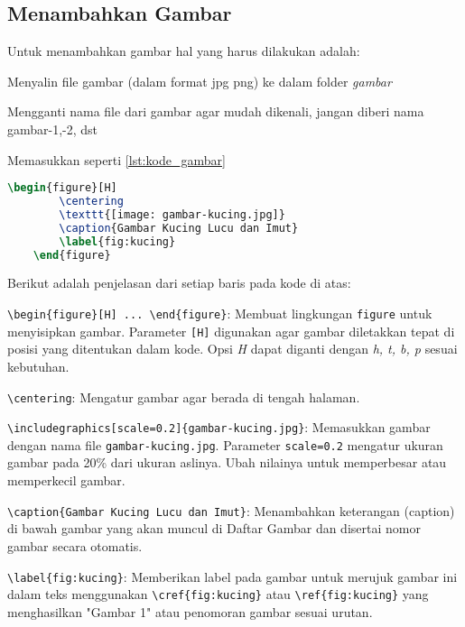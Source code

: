 \subsection{Menambahkan Gambar}
Untuk menambahkan gambar hal yang harus dilakukan adalah:
\begin{packed_enum}
    \item Menyalin file gambar (dalam format jpg \/ png) ke dalam folder \textit{gambar}
    \item Mengganti nama file dari gambar agar mudah dikenali, jangan diberi nama gambar-1,-2, dst
    \item Memasukkan seperti \cref{lst:kode_gambar}
\end{packed_enum}

\begin{lstlisting}[language=TeX, caption=Kode untuk Menyisipkan Gambar dalam Dokumen, label=lst:kode_gambar]
    \begin{figure}[H]
        \centering
        \texttt{[image: gambar-kucing.jpg]}
        \caption{Gambar Kucing Lucu dan Imut}
        \label{fig:kucing}
    \end{figure}
\end{lstlisting}

\noindent Berikut adalah penjelasan dari setiap baris pada kode di atas:

\begin{packed_enum}
    \item \texttt{\textbackslash begin\{figure\}[H] ... \textbackslash end\{figure\}}: Membuat lingkungan \texttt{figure} untuk menyisipkan gambar. Parameter \texttt{[H]} digunakan agar gambar diletakkan tepat di posisi yang ditentukan dalam kode. Opsi \textit{H} dapat diganti dengan \textit{h, t, b, p} sesuai kebutuhan.
    \item \texttt{\textbackslash centering}: Mengatur gambar agar berada di tengah halaman.
    \item \texttt{\textbackslash includegraphics[scale=0.2]\{gambar-kucing.jpg\}}: Memasukkan gambar dengan nama file \texttt{gambar-kucing.jpg}. Parameter \texttt{scale=0.2} mengatur ukuran gambar pada 20\% dari ukuran aslinya. Ubah nilainya untuk memperbesar atau memperkecil gambar.
    \item \texttt{\textbackslash caption\{Gambar Kucing Lucu dan Imut\}}: Menambahkan keterangan (caption) di bawah gambar yang akan muncul di Daftar Gambar dan disertai nomor gambar secara otomatis.
    \item \texttt{\textbackslash label\{fig:kucing\}}: Memberikan label pada gambar untuk merujuk gambar ini dalam teks menggunakan \texttt{\textbackslash cref\{fig:kucing\}} atau \texttt{\textbackslash ref\{fig:kucing\}} yang menghasilkan "Gambar 1" atau penomoran gambar sesuai urutan.
\end{packed_enum}

